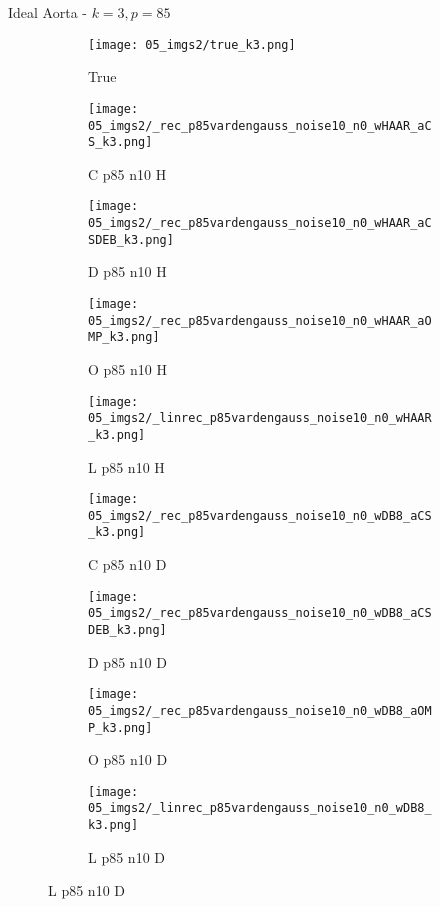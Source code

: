 \begin{frame}{Ideal Aorta - $k=3,p=85$}{}
\begin{figure}
\begin{subfigure}{0.1\textwidth}
\texttt{[image: 05\_imgs2/true\_k3.png]}
\caption*{\Tiny True}
\end{subfigure}
\begin{subfigure}{0.1\textwidth}
\texttt{[image: 05\_imgs2/\_rec\_p85vardengauss\_noise10\_n0\_wHAAR\_aCS\_k3.png]}
\caption*{\Tiny C p85 n10 H}
\end{subfigure}
\begin{subfigure}{0.1\textwidth}
\texttt{[image: 05\_imgs2/\_rec\_p85vardengauss\_noise10\_n0\_wHAAR\_aCSDEB\_k3.png]}
\caption*{\Tiny D p85 n10 H}
\end{subfigure}
\begin{subfigure}{0.1\textwidth}
\texttt{[image: 05\_imgs2/\_rec\_p85vardengauss\_noise10\_n0\_wHAAR\_aOMP\_k3.png]}
\caption*{\Tiny O p85 n10 H}
\end{subfigure}
\begin{subfigure}{0.1\textwidth}
\texttt{[image: 05\_imgs2/\_linrec\_p85vardengauss\_noise10\_n0\_wHAAR\_k3.png]}
\caption*{\Tiny L p85 n10 H}
\end{subfigure}
\begin{subfigure}{0.1\textwidth}
\texttt{[image: 05\_imgs2/\_rec\_p85vardengauss\_noise10\_n0\_wDB8\_aCS\_k3.png]}
\caption*{\Tiny C p85 n10 D}
\end{subfigure}
\begin{subfigure}{0.1\textwidth}
\texttt{[image: 05\_imgs2/\_rec\_p85vardengauss\_noise10\_n0\_wDB8\_aCSDEB\_k3.png]}
\caption*{\Tiny D p85 n10 D}
\end{subfigure}
\begin{subfigure}{0.1\textwidth}
\texttt{[image: 05\_imgs2/\_rec\_p85vardengauss\_noise10\_n0\_wDB8\_aOMP\_k3.png]}
\caption*{\Tiny O p85 n10 D}
\end{subfigure}
\begin{subfigure}{0.1\textwidth}
\texttt{[image: 05\_imgs2/\_linrec\_p85vardengauss\_noise10\_n0\_wDB8\_k3.png]}
\caption*{\Tiny L p85 n10 D}
\end{subfigure}

\vspace{5pt}


\end{figure}
\end{frame}
